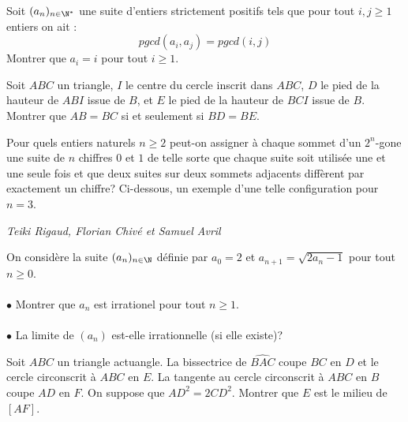 \begin{exo}{}
Soit $(a_n)_{n\in \N^*}$ une suite d'entiers strictement positifs tels que pour tout $i,j\ge 1$ entiers on ait :
$$pgcd(a_i,a_j)=pgcd(i,j)$$
Montrer que $a_i=i$ pour tout $i\ge 1$.
\end{exo}

\begin{exo}{}
Soit $ABC$ un triangle, $I$ le centre du cercle inscrit dans $ABC$, $D$ le pied de la hauteur de $ABI$ issue de $B$,
et $E$ le pied de la hauteur de $BCI$ issue de $B$.
Montrer que $AB = BC$ si et seulement si $BD = BE$.
\end{exo}

\begin{exo}{}
Pour quels entiers naturels $n\geq2$ peut-on assigner à chaque sommet d'un $2^n$-gone une suite de $n$ chiffres $0$ et $1$ de telle sorte que chaque suite soit utilisée une et une seule fois et que deux suites sur deux sommets adjacents diffèrent par exactement un chiffre? Ci-dessous, un exemple d'une telle configuration pour $n=3$.
\begin{center}
\end{center}

\medskip
\textit{Teiki Rigaud, Florian Chivé et Samuel Avril}
\end{exo}

\begin{exo}{}
On considère la suite $(a_n)_{n\in \N}$ définie par $a_0=2$ et $a_{n+1}=\sqrt{2a_n-1}$ pour tout $n\ge 0$.\\~~\\
$\bullet$ Montrer que $a_n$ est irrationel pour tout $n\ge 1$.\\~~\\
$\bullet$ La limite de $(a_n)$ est-elle irrationnelle (si elle existe)?
\end{exo}



\begin{exo}{}
Soit $ABC$ un triangle actuangle. La bissectrice de $\widehat{BAC}$ coupe $BC$ en $D$ et le cercle circonscrit à $ABC$ en $E$. La tangente au cercle circonscrit à $ABC$ en $B$ coupe $AD$ en $F$. On suppose que $AD^2=2CD^2$. Montrer que $E$ est le milieu de $[AF]$.
 \end{exo}


